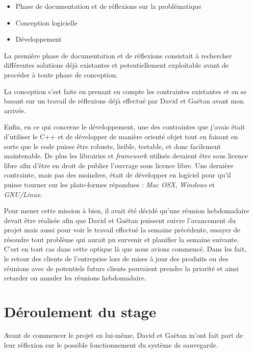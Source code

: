 \documentclass[a4paper,10pt, twoside]{report}
\begin{document}
\begin{spacing}{1.2}
\begin{itemize}
 \item Phase de documentation et de réflexions sur la problématique
 \item Conception logicielle
 \item Développement
\end{itemize}

La première phase de documentation et de réflexions consistait à
rechercher différentes solutions déjà existantes et potentiellement
exploitable avant de procéder à toute phase de conception.

La conception s'est faite en prenant en compte les contraintes existantes
et en se basant sur un travail de réflexions déjà effectué par David et
Gaëtan avant mon arrivée.

Enfin, en ce qui concerne le développement, une des contraintes que j'avais
était d'utiliser le C++ et de développer de manière orienté objet tout
en faisant en sorte que le code puisse être robuste, lisible, testable, et
donc facilement maintenable. De plus les librairies et \textit{framework}
utilisés devaient être sous licence libre afin d'être en droit de publier
l'ouvrage sous licence libre. Une dernière contrainte, mais pas des moindres,
était de développer en logiciel pour qu'il puisse tourner sur les
plate-formes répandues : \textit{Mac OSX}, \textit{Windows} et
\textit{GNU/Linux}.

Pour mener cette mission à bien, il avait été décidé qu'une réunion
hebdomadaire devait être réalisée afin que David et Gaëtan puissent
suivre l'avancement du projet mais aussi pour voir le travail effectué la
semaine précédente, essayer de résoudre tout problème qui aurait pu
survenir et planifier la semaine suivante.
C'est en tout cas dans cette optique là que nous avions commencé. Dans les
fait, le retour des clients de l'entreprise lors de mises à jour des produits
ou des réunions avec de potentiels futurs clients pouvaient prendre la
priorité et ainsi retarder ou annuler les réunions hebdomadaire.

\chapter{Déroulement du stage}
\thispagestyle{fancy}
Avant de commencer le projet en lui-même, David et Gaëtan m'ont fait part
de leur réflexion sur le possible fonctionnement du système de sauvegarde.


\end{spacing}
\end{document}
